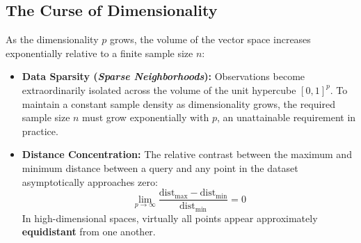 \subsection{The Curse of Dimensionality}
As the dimensionality $p$ grows, the volume of the vector space increases exponentially relative to a finite sample size $n$:
\begin{itemize}
    \item \textbf{Data Sparsity (\textit{Sparse Neighborhoods}):} Observations become extraordinarily isolated across the volume of the unit hypercube $[0, 1]^p$. To maintain a constant sample density as dimensionality grows, the required sample size $n$ must grow exponentially with $p$, an unattainable requirement in practice.
    \item \textbf{Distance Concentration:} The relative contrast between the maximum and minimum distance between a query and any point in the dataset asymptotically approaches zero:
    \begin{equation}
    \lim_{p \to \infty} \frac{\text{dist}_{\max} - \text{dist}_{\min}}{\text{dist}_{\min}} = 0
    \end{equation}
    In high-dimensional spaces, virtually all points appear approximately \textbf{equidistant} from one another.
\end{itemize}

